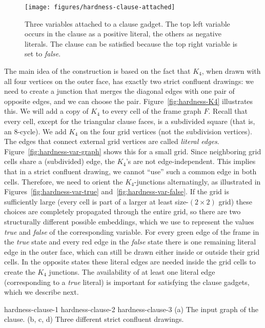 \documentclass{llncs}
\begin{document}
\begin{wrapfigure}[18]{r}{0.4\textwidth}
\centering
    \texttt{[image: figures/hardness-clause-attached]}
	\caption{Three variables attached to a clause gadget. The top left variable occurs in the clause as a positive literal, the others as negative literals. The clause can be satisfied because the top right variable is set to \emph {false}.}
	\label{fig:hardness-clause-attached}
\end{wrapfigure}
The main idea of the construction is based on the fact that $K_4$, when drawn with all four vertices on the outer face, has exactly two strict confluent drawings: we need to create a junction that merges the diagonal edges with one pair of opposite edges, and we can choose the pair.
Figure~\ref {fig:hardness-K4} illustrates this.
We will add a copy of $K_4$ to every cell of the frame graph $F$. Recall that every cell, except for the triangular clause faces, is a subdivided square (that is, an $8$-cycle). We add $K_4$ on the four grid vertices (not the subdivision vertices). The edges that connect external grid vertices are called \emph{literal edges}.
Figure~\ref {fig:hardness-var-graph} shows this for a small grid.
Since neighboring grid cells share a (subdivided) edge, the $K_4$'s are not edge-independent. This implies that in a strict confluent drawing, we cannot ``use'' such a common edge in both cells. Therefore, we need to orient the $K_4$-junctions alternatingly, as illustrated in Figures~\ref {fig:hardness-var-true} and~\ref {fig:hardness-var-false}.
If the grid is sufficiently large (every cell is part of a larger at least size-$(2 \times 2)$ grid) these choices are completely propagated through the entire grid, so there are two structurally different possible embeddings,  which we use to represent the values \emph {true} and \emph {false} of the corresponding variable. For every green edge of the frame in the \emph{true} state and every red edge in the \emph{false} state there is one remaining literal edge in the outer face, which can still be drawn either inside or outside their grid cells. In the opposite states these literal edges are needed inside the grid cells to create the $K_4$ junctions.  The availability of at least one literal edge (corresponding to a \emph{true} literal) is important for satisfying the clause gadgets, which we describe next.


 {hardness-clause-1} {hardness-clause-2} {hardness-clause-3}
{ (a) The input graph of the clause.
  (b, c, d) Three different strict confluent drawings.
}
\end{document}
